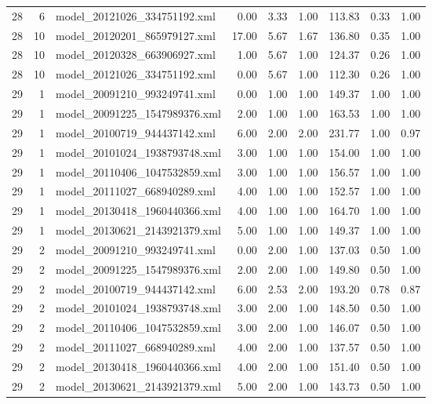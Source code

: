\begin{table}[ht]
\begin{tabular}{rrlrrrrrr}
   28 &   6 & model\_20121026\_334751192.xml & 0.00 & 3.33 & 1.00 & 113.83 & 0.33 & 1.00 \\ 
   28 &  10 & model\_20120201\_865979127.xml & 17.00 & 5.67 & 1.67 & 136.80 & 0.35 & 1.00 \\ 
   28 &  10 & model\_20120328\_663906927.xml & 1.00 & 5.67 & 1.00 & 124.37 & 0.26 & 1.00 \\ 
   28 &  10 & model\_20121026\_334751192.xml & 0.00 & 5.67 & 1.00 & 112.30 & 0.26 & 1.00 \\ 
   29 &   1 & model\_20091210\_993249741.xml & 0.00 & 1.00 & 1.00 & 149.37 & 1.00 & 1.00 \\ 
   29 &   1 & model\_20091225\_1547989376.xml & 2.00 & 1.00 & 1.00 & 163.53 & 1.00 & 1.00 \\ 
   29 &   1 & model\_20100719\_944437142.xml & 6.00 & 2.00 & 2.00 & 231.77 & 1.00 & 0.97 \\ 
   29 &   1 & model\_20101024\_1938793748.xml & 3.00 & 1.00 & 1.00 & 154.00 & 1.00 & 1.00 \\ 
   29 &   1 & model\_20110406\_1047532859.xml & 3.00 & 1.00 & 1.00 & 156.57 & 1.00 & 1.00 \\ 
   29 &   1 & model\_20111027\_668940289.xml & 4.00 & 1.00 & 1.00 & 152.57 & 1.00 & 1.00 \\ 
   29 &   1 & model\_20130418\_1960440366.xml & 4.00 & 1.00 & 1.00 & 164.70 & 1.00 & 1.00 \\ 
   29 &   1 & model\_20130621\_2143921379.xml & 5.00 & 1.00 & 1.00 & 149.37 & 1.00 & 1.00 \\ 
   29 &   2 & model\_20091210\_993249741.xml & 0.00 & 2.00 & 1.00 & 137.03 & 0.50 & 1.00 \\ 
   29 &   2 & model\_20091225\_1547989376.xml & 2.00 & 2.00 & 1.00 & 149.80 & 0.50 & 1.00 \\ 
   29 &   2 & model\_20100719\_944437142.xml & 6.00 & 2.53 & 2.00 & 193.20 & 0.78 & 0.87 \\ 
   29 &   2 & model\_20101024\_1938793748.xml & 3.00 & 2.00 & 1.00 & 148.50 & 0.50 & 1.00 \\ 
   29 &   2 & model\_20110406\_1047532859.xml & 3.00 & 2.00 & 1.00 & 146.07 & 0.50 & 1.00 \\ 
   29 &   2 & model\_20111027\_668940289.xml & 4.00 & 2.00 & 1.00 & 137.57 & 0.50 & 1.00 \\ 
   29 &   2 & model\_20130418\_1960440366.xml & 4.00 & 2.00 & 1.00 & 151.40 & 0.50 & 1.00 \\ 
   29 &   2 & model\_20130621\_2143921379.xml & 5.00 & 2.00 & 1.00 & 143.73 & 0.50 & 1.00 \\ 

\end{tabular}
\end{table}
